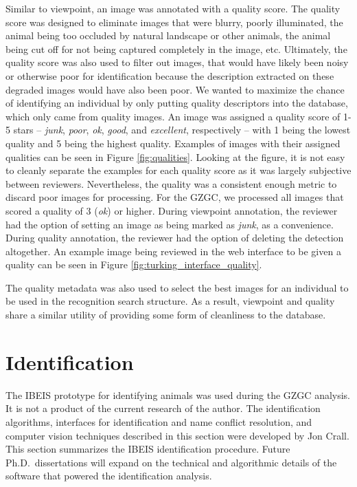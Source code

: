 Similar to viewpoint, an image was annotated with a quality score.  The quality score was designed to eliminate images that were blurry, poorly illuminated, the animal being too occluded by natural landscape or other animals, the animal being cut off for not being captured completely in the image, etc.  Ultimately, the quality score was also used to filter out images, that would have likely been noisy or otherwise poor for identification because the description extracted on these degraded images would have also been poor.  We wanted to maximize the chance of identifying an individual by only putting quality descriptors into the database, which only came from quality images.  An image was assigned a quality score of 1-5 stars -- \textit{junk}, \textit{poor}, \textit{ok}, \textit{good}, and \textit{excellent}, respectively -- with 1 being the lowest quality and 5 being the highest quality.  Examples of images with their assigned qualities can be seen in Figure \ref{fig:qualities}.  Looking at the figure, it is not easy to cleanly separate the examples for each quality score as it was largely subjective between reviewers.  Nevertheless, the quality was a consistent enough metric to discard poor images for processing.  For the GZGC, we processed all images that scored a quality of 3 (\textit{ok}) or higher.  During viewpoint annotation, the reviewer had the option of setting an image as being marked as \textit{junk}, as a convenience.  During quality annotation, the reviewer had the option of deleting the detection altogether.  An example image being reviewed in the web interface to be given a quality can be seen in Figure \ref{fig:turking_interface_quality}.

The quality metadata was also used to select the best images for an individual to be used in the recognition search structure.  As a result, viewpoint and quality share a similar utility of providing some form of cleanliness to the database.  %

\section{Identification} \label{sec:identification}
The IBEIS prototype for identifying animals was used during the GZGC analysis.  It is not a product of the current research of the author.  The identification algorithms, interfaces for identification and name conflict resolution, and computer vision techniques described in this section were developed by Jon Crall.  This section summarizes the IBEIS identification procedure.  Future Ph.D.\ dissertations will expand on the technical and algorithmic details of the software that powered the identification analysis.

